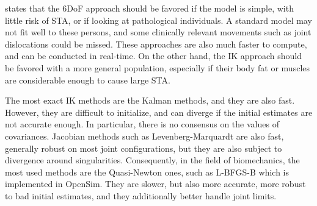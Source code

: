 \cite{Aristidou2018} states that the 6DoF approach should be favored if the model is simple, with little risk of STA, or if looking at pathological individuals. A standard model may not fit well to these persons, and some clinically relevant movements such as joint dislocations could be missed. These approaches are also much faster to compute, and can be conducted in real-time. On the other hand, the IK approach should be favored with a more general population, especially if their body fat or muscles are considerable enough to cause large STA.

The most exact IK methods are the Kalman methods, and they are also fast. However, they are difficult to initialize, and can diverge if the initial estimates are not accurate enough. In particular, there is no consensus on the values of covariances. Jacobian methods such as Levenberg-Marquardt are also fast, generally robust on most joint configurations, but they are also subject to divergence around singularities. Consequently, in the field of biomechanics, the most used methods are the Quasi-Newton ones, such as L-BFGS-B which is implemented in OpenSim. They are slower, but also more accurate, more robust to bad initial estimates, and they additionally better handle joint limits. 


